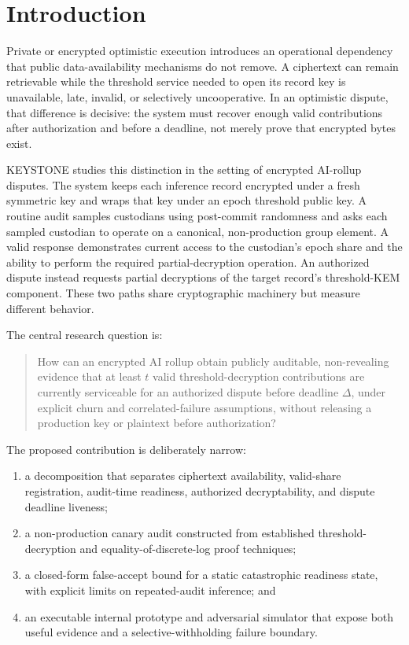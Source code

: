 \documentclass[10pt]{article}
\begin{document}
\section{Introduction}

Private or encrypted optimistic execution introduces an operational dependency that public data-availability mechanisms do not remove. A ciphertext can remain retrievable while the threshold service needed to open its record key is unavailable, late, invalid, or selectively uncooperative. In an optimistic dispute, that difference is decisive: the system must recover enough valid contributions after authorization and before a deadline, not merely prove that encrypted bytes exist.

KEYSTONE studies this distinction in the setting of encrypted AI-rollup disputes. The system keeps each inference record encrypted under a fresh symmetric key and wraps that key under an epoch threshold public key. A routine audit samples custodians using post-commit randomness and asks each sampled custodian to operate on a canonical, non-production group element. A valid response demonstrates current access to the custodian's epoch share and the ability to perform the required partial-decryption operation. An authorized dispute instead requests partial decryptions of the target record's threshold-KEM component. These two paths share cryptographic machinery but measure different behavior.

The central research question is:

\begin{quote}
How can an encrypted AI rollup obtain publicly auditable, non-revealing evidence that at least $t$ valid threshold-decryption contributions are currently serviceable for an authorized dispute before deadline $\Delta$, under explicit churn and correlated-failure assumptions, without releasing a production key or plaintext before authorization?
\end{quote}

The proposed contribution is deliberately narrow:

\begin{enumerate}
  \item a decomposition that separates ciphertext availability, valid-share registration, audit-time readiness, authorized decryptability, and dispute deadline liveness;
  \item a non-production canary audit constructed from established threshold-decryption and equality-of-discrete-log proof techniques;
  \item a closed-form false-accept bound for a static catastrophic readiness state, with explicit limits on repeated-audit inference; and
  \item an executable internal prototype and adversarial simulator that expose both useful evidence and a selective-withholding failure boundary.
\end{enumerate}
\end{document}
